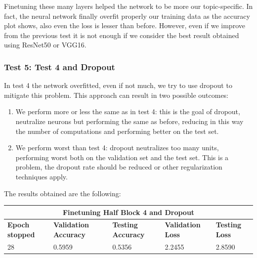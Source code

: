 Finetuning these many layers helped the network to be more our topic-specific. In fact, the neural network finally overfit properly our training data as the accuracy plot shows, also even the loss is lesser than before. However, even if we improve from the previous test it is not enough if we consider the best result obtained using ResNet50 or VGG16.


\subsubsection{Test 5: Test 4 and Dropout}
In test 4 the network overfitted, even if not much, we try to use dropout to mitigate this problem. This approach can result in two possible outcomes:

\begin{enumerate}
	\item We perform more or less the same as in test 4: this is the goal of dropout, neutralize neurons but performing the same as before, reducing in this way the number of computations and performing better on the test set.
	\item We perform worst than test 4: dropout neutralizes too many units, performing worst both on the validation set and the test set. This is a problem, the dropout rate should be reduced or other regularization techniques apply.
\end{enumerate}

\noindent The results obtained are the following:

\medskip

\begin{tabular}{ |p{2cm}|p{2cm}|p{2cm}|p{2cm}|p{2cm}|  }
\hline
\multicolumn{5}{|c|}{Finetuning Half Block 4 and Dropout} \\
\hline
\textbf{Epoch stopped} & \textbf{Validation Accuracy} & \textbf{Testing Accuracy} & \textbf{Validation Loss} & \textbf{Testing Loss} \\
\hline
28 & 0.5959 & 0.5356 & 2.2455 & 2.8590\\
\hline
\end{tabular}


